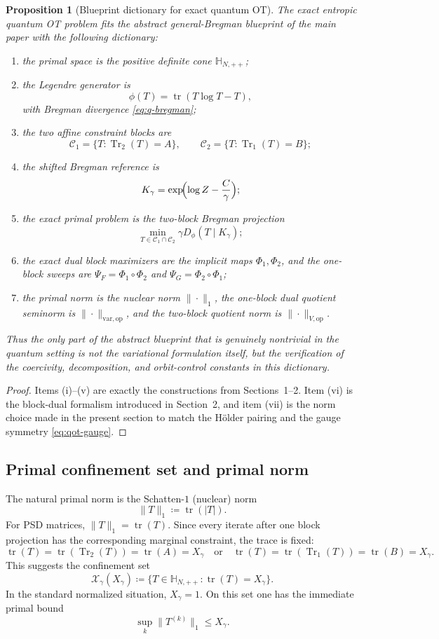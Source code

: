 \documentclass[11pt]{article}
\newcommand{\tr}{\operatorname{tr}}
\newcommand{\Trone}{\operatorname{Tr}_{1}}
\newcommand{\Trtwo}{\operatorname{Tr}_{2}}
\newcommand{\eqdef}{\coloneqq}
\newcommand{\Hh}{\mathbb{H}}
\newcommand{\Cc}{\mathcal{C}}
\newcommand{\Xx}{\mathcal{X}}
\newcommand{\op}{\mathrm{op}}
\newcommand{\varop}{\mathrm{var},\op}
\theoremstyle{plain}
\newtheorem{proposition}{Proposition}[section]
\begin{document}
\begin{proposition}[Blueprint dictionary for exact quantum OT]
\label{prop:qot-blueprint-dictionary}
The exact entropic quantum OT problem fits the abstract general-Bregman blueprint of the main paper with the following dictionary:
\begin{enumerate}[label=\textnormal{(\roman*)}]
\item the primal space is the positive definite cone $\Hh_{N,++}$;
\item the Legendre generator is
\[
\phi(T)=\tr(T\log T-T),
\]
with Bregman divergence \eqref{eq:q-bregman};
\item the two affine constraint blocks are
\[
\Cc_1=\{T:\Trtwo(T)=A\},
\qquad
\Cc_2=\{T:\Trone(T)=B\};
\]
\item the shifted Bregman reference is
\[
K_\gamma=\exp\!\Bigl(\log Z-\frac{C}{\gamma}\Bigr);
\]
\item the exact primal problem is the two-block Bregman projection
\[
\min_{T\in \Cc_1\cap \Cc_2}\gamma D_\phi(T\mid K_\gamma);
\]
\item the exact dual block maximizers are the implicit maps $\Phi_1,\Phi_2$, and the one-block sweeps are $\Psi_F=\Phi_1\circ\Phi_2$ and $\Psi_G=\Phi_2\circ\Phi_1$;
\item the primal norm is the nuclear norm $\|\cdot\|_1$, the one-block dual quotient seminorm is $\|\cdot\|_{\varop}$, and the two-block quotient norm is $\|\cdot\|_{V,\op}$.
\end{enumerate}
Thus the only part of the abstract blueprint that is genuinely nontrivial in the quantum setting is not the variational formulation itself, but the verification of the coercivity, decomposition, and orbit-control constants in this dictionary.
\end{proposition}

\begin{proof}
Items (i)--(v) are exactly the constructions from Sections~1--2.
Item (vi) is the block-dual formalism introduced in Section~2, and item (vii) is the norm choice made in the present section to match the Hölder pairing and the gauge symmetry \eqref{eq:qot-gauge}.
\end{proof}


\subsection{Primal confinement set and primal norm}

The natural primal norm is the Schatten-$1$ (nuclear) norm
\[
\|T\|_1 \eqdef \tr(|T|).
\]
For PSD matrices, $\|T\|_1=\tr(T)$.
Since every iterate after one block projection has the corresponding marginal constraint, the trace is fixed:
\[
\tr(T)=\tr(\Trtwo(T))=\tr(A)=X_\gamma
\quad \text{or} \quad
\tr(T)=\tr(\Trone(T))=\tr(B)=X_\gamma.
\]
This suggests the confinement set
\begin{equation}
\label{eq:primal-confinement}
\Xx_\gamma(X_\gamma)
\eqdef
\{ T \in \Hh_{N,++} : \tr(T)=X_\gamma \}.
\end{equation}
In the standard normalized situation, $X_\gamma=1$.
On this set one has the immediate primal bound
\[
\sup_k \|T^{(k)}\|_1 \le X_\gamma.
\]
\end{document}
